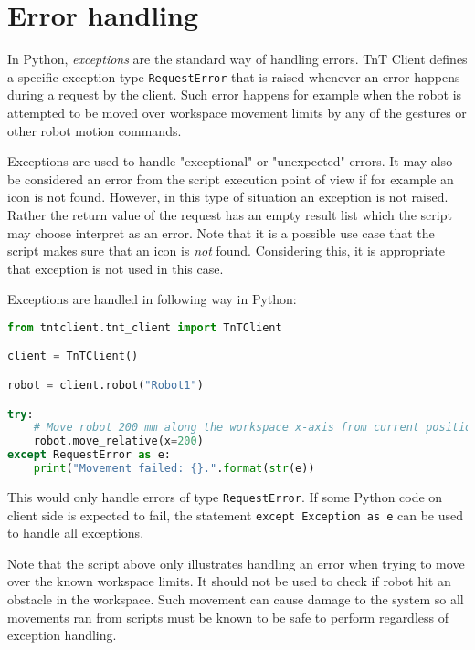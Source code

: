 
\section{Error handling}

In Python, \textit{exceptions} are the standard way of handling errors. TnT Client defines a specific exception type \texttt{RequestError} that is raised whenever an error happens during a request by the client. Such error happens for example when the robot is attempted to be moved over workspace movement limits by any of the gestures or other robot motion commands.

Exceptions are used to handle "exceptional" or "unexpected" errors. It may also be considered an error from the script execution point of view if for example an icon is not found. However, in this type of situation an exception is not raised. Rather the return value of the request has an empty result list which the script may choose interpret as an error. Note that it is a possible use case that the script makes sure that an icon is \emph{not} found. Considering this, it is appropriate that exception is not used in this case.

Exceptions are handled in following way in Python:

\begin{lstlisting}[language=Python]
from tntclient.tnt_client import TnTClient

client = TnTClient()

robot = client.robot("Robot1")

try:
    # Move robot 200 mm along the workspace x-axis from current position.
    robot.move_relative(x=200)
except RequestError as e:
    print("Movement failed: {}.".format(str(e))
\end{lstlisting}

This would only handle errors of type \texttt{RequestError}. If some Python code on client side is expected to fail, the statement \texttt{except Exception as e} can be used to handle all exceptions.

Note that the script above only illustrates handling an error when trying to move over the known workspace limits. It should not be used to check if robot hit an obstacle in the workspace. Such movement can cause damage to the system so all movements ran from scripts must be known to be safe to perform regardless of exception handling.

